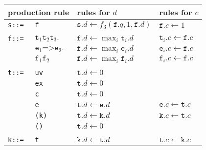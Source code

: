 \begin{figure}
\begin{center}%
\small
\begin{tabular}{llll}
\hline
\multicolumn{2}{l}{production rule} & rules for $d$ & rules for $c$\\
  \hline
\texttt{s::=}&\texttt{f}& $\texttt{s}.d \leftarrow f_3(\texttt{f}.q, 1, \texttt{f}.d)$& $ \texttt{f}.c \leftarrow 1$\\
       &&\\
\texttt{f::=} &$\texttt{t}_1 \texttt{t}_2 \texttt{t}_3.$&   $ \texttt{f}.d \leftarrow \max_i \texttt{t}_i.d$ 
                                                             & $\texttt{t}_i.c \leftarrow \texttt{f}.c$\\
    &$\texttt{e}_1 \texttt{=>}  \texttt{e}_2.$& $\texttt{f}.d \leftarrow \max_i \texttt{e}_i.d$ & $\texttt{e}_i.c \leftarrow \texttt{f}.c$ \\
    &$\texttt{f}_1 \texttt{f}_2$ &                $\texttt{f}.d \leftarrow \max_i \texttt{f}_i.d$  &     $\texttt{f}_i.c \leftarrow \texttt{f}.c$\\
&&\\
\texttt{t::=}&\texttt{uv} %
&                $\texttt{t}.d \leftarrow 0$ %
&              \\
            &\texttt{ex} &               $\texttt{t}.d \leftarrow 0$&              \\
      &\texttt{c} &               $\texttt{t}.d \leftarrow 0$&               \\
      &\texttt{e} &                $\texttt{t}.d \leftarrow\texttt{e}.d $ &   $\texttt{e}.c \leftarrow\texttt{t}.c$        \\
      &\texttt{(k)}& $\texttt{t}.d \leftarrow\texttt{k}.d$& $\texttt{k}.c \leftarrow\texttt{t}.c$\\
      &\texttt{()}& $\texttt{t}.d \leftarrow 0$& \\
      &&\\
\texttt{k::=}&\texttt{t}     & $\texttt{k}.d \leftarrow\texttt{t}.d$ & $\texttt{t}.c \leftarrow\texttt{k}.c$\\

\end{tabular}
\end{center}
\end{figure}
